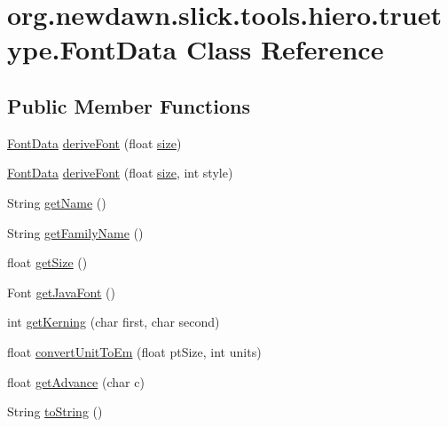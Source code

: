 \hypertarget{classorg_1_1newdawn_1_1slick_1_1tools_1_1hiero_1_1truetype_1_1_font_data}{}\section{org.\+newdawn.\+slick.\+tools.\+hiero.\+truetype.\+Font\+Data Class Reference}
\label{classorg_1_1newdawn_1_1slick_1_1tools_1_1hiero_1_1truetype_1_1_font_data}
\subsection*{Public Member Functions}
\begin{DoxyCompactItemize}
\item 
\mbox{\hyperlink{classorg_1_1newdawn_1_1slick_1_1tools_1_1hiero_1_1truetype_1_1_font_data}{Font\+Data}} \mbox{\hyperlink{classorg_1_1newdawn_1_1slick_1_1tools_1_1hiero_1_1truetype_1_1_font_data_a15b684f10d110c105f3343f2651c7291}{derive\+Font}} (float \mbox{\hyperlink{classorg_1_1newdawn_1_1slick_1_1tools_1_1hiero_1_1truetype_1_1_font_data_a96af538e2a7368fdba46ffc2ad6a9a0e}{size}})
\item 
\mbox{\hyperlink{classorg_1_1newdawn_1_1slick_1_1tools_1_1hiero_1_1truetype_1_1_font_data}{Font\+Data}} \mbox{\hyperlink{classorg_1_1newdawn_1_1slick_1_1tools_1_1hiero_1_1truetype_1_1_font_data_adc39e9ffe35a2f9568e99b18cd59e876}{derive\+Font}} (float \mbox{\hyperlink{classorg_1_1newdawn_1_1slick_1_1tools_1_1hiero_1_1truetype_1_1_font_data_a96af538e2a7368fdba46ffc2ad6a9a0e}{size}}, int style)
\item 
String \mbox{\hyperlink{classorg_1_1newdawn_1_1slick_1_1tools_1_1hiero_1_1truetype_1_1_font_data_a68cb4ad825dd0c861f8019e47319b6a1}{get\+Name}} ()
\item 
String \mbox{\hyperlink{classorg_1_1newdawn_1_1slick_1_1tools_1_1hiero_1_1truetype_1_1_font_data_a4c170863a370f609118f9acbc8d598a7}{get\+Family\+Name}} ()
\item 
float \mbox{\hyperlink{classorg_1_1newdawn_1_1slick_1_1tools_1_1hiero_1_1truetype_1_1_font_data_a79b92fcb829cda72932798ccea4773bd}{get\+Size}} ()
\item 
Font \mbox{\hyperlink{classorg_1_1newdawn_1_1slick_1_1tools_1_1hiero_1_1truetype_1_1_font_data_a3b982990cc4c4f1d489e2ffe3e2fc431}{get\+Java\+Font}} ()
\item 
int \mbox{\hyperlink{classorg_1_1newdawn_1_1slick_1_1tools_1_1hiero_1_1truetype_1_1_font_data_a21314f898e3393444e54c0aeefb9ed2a}{get\+Kerning}} (char first, char second)
\item 
float \mbox{\hyperlink{classorg_1_1newdawn_1_1slick_1_1tools_1_1hiero_1_1truetype_1_1_font_data_ae82293147d863b46f9c3d52cfc75771b}{convert\+Unit\+To\+Em}} (float pt\+Size, int units)
\item 
float \mbox{\hyperlink{classorg_1_1newdawn_1_1slick_1_1tools_1_1hiero_1_1truetype_1_1_font_data_ad2145125927d20f203f0d66f68c366cf}{get\+Advance}} (char c)
\item 
String \mbox{\hyperlink{classorg_1_1newdawn_1_1slick_1_1tools_1_1hiero_1_1truetype_1_1_font_data_a452e44a300086abeb9da1430bd7c1941}{to\+String}} ()
\end{DoxyCompactItemize}
